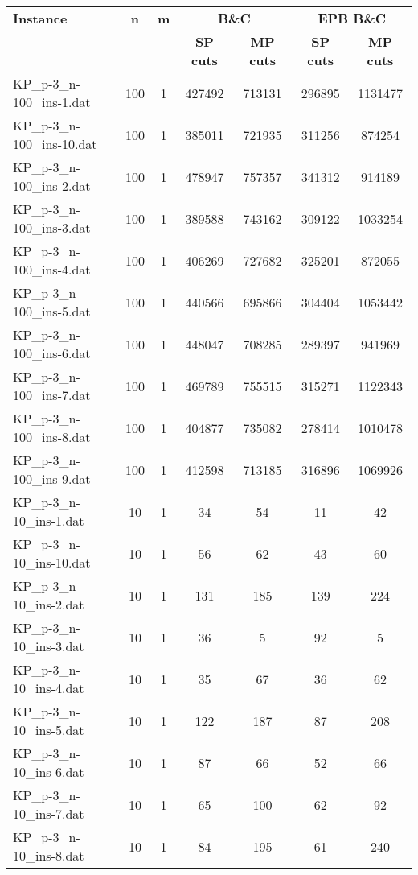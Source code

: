 \begin{table}[!ht]
\centering
\hspace*{-1cm}\begin{tabular}{lcccccc}
\toprule
\textbf{Instance} & \textbf{n} & \textbf{m} & \multicolumn{2}{c}{\textbf{B\&C}}  & \multicolumn{2}{c}{\textbf{EPB B\&C}}
\\
\cmidrule(r){4-5} \cmidrule(r){6-7} 
~ & ~ & ~ & \textbf{SP cuts} &\textbf{MP cuts} & \textbf{SP cuts} &\textbf{MP cuts} \\
\midrule

KP\_p-3\_n-100\_ins-1.dat & 100 & 1 & 427492 & 713131 & 296895 & 1131477 \\
KP\_p-3\_n-100\_ins-10.dat & 100 & 1 & 385011 & 721935 & 311256 & 874254 \\
KP\_p-3\_n-100\_ins-2.dat & 100 & 1 & 478947 & 757357 & 341312 & 914189 \\
KP\_p-3\_n-100\_ins-3.dat & 100 & 1 & 389588 & 743162 & 309122 & 1033254 \\
KP\_p-3\_n-100\_ins-4.dat & 100 & 1 & 406269 & 727682 & 325201 & 872055 \\
KP\_p-3\_n-100\_ins-5.dat & 100 & 1 & 440566 & 695866 & 304404 & 1053442 \\
KP\_p-3\_n-100\_ins-6.dat & 100 & 1 & 448047 & 708285 & 289397 & 941969 \\
KP\_p-3\_n-100\_ins-7.dat & 100 & 1 & 469789 & 755515 & 315271 & 1122343 \\
KP\_p-3\_n-100\_ins-8.dat & 100 & 1 & 404877 & 735082 & 278414 & 1010478 \\
KP\_p-3\_n-100\_ins-9.dat & 100 & 1 & 412598 & 713185 & 316896 & 1069926 \\
KP\_p-3\_n-10\_ins-1.dat & 10 & 1 & 34 & 54 & 11 & 42 \\
KP\_p-3\_n-10\_ins-10.dat & 10 & 1 & 56 & 62 & 43 & 60 \\
KP\_p-3\_n-10\_ins-2.dat & 10 & 1 & 131 & 185 & 139 & 224 \\
KP\_p-3\_n-10\_ins-3.dat & 10 & 1 & 36 & 5 & 92 & 5 \\
KP\_p-3\_n-10\_ins-4.dat & 10 & 1 & 35 & 67 & 36 & 62 \\
KP\_p-3\_n-10\_ins-5.dat & 10 & 1 & 122 & 187 & 87 & 208 \\
KP\_p-3\_n-10\_ins-6.dat & 10 & 1 & 87 & 66 & 52 & 66 \\
KP\_p-3\_n-10\_ins-7.dat & 10 & 1 & 65 & 100 & 62 & 92 \\
KP\_p-3\_n-10\_ins-8.dat & 10 & 1 & 84 & 195 & 61 & 240 \\

\end{tabular}
\end{table}
